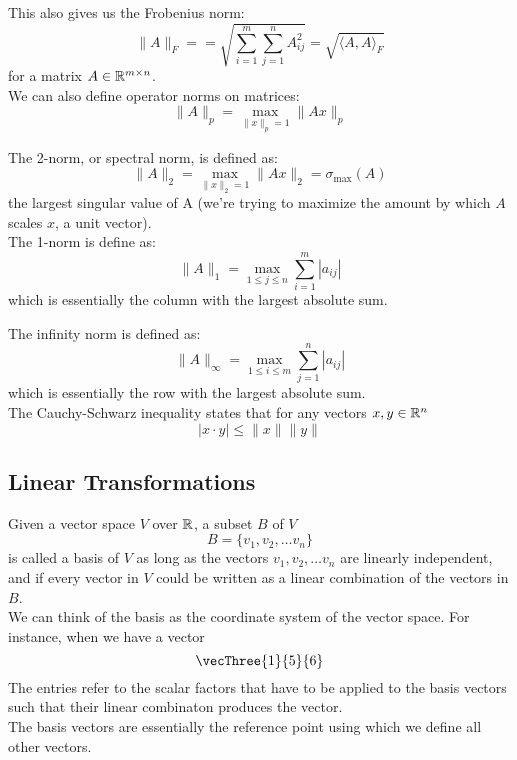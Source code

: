 \documentclass[12pt]{article}
\begin{document}
    This also gives us the Frobenius norm:
    \[ \| A \|_F = = 
    \sqrt{\sum_{i=1}^m\sum_{j=1}^n A_{ij}^2}
    = \sqrt{\langle A, A \rangle_F } \]
    for a matrix $A \in \mathbb{R}^{m \times n}$. \\

    We can also define operator norms on matrices:
    \[ \|A\|_p = \max_{\|x\|_p = 1}\|Ax\|_p \]
    
    The 2-norm, or spectral norm,
    is defined as:
    \[ \|A\|_2 = \max_{\|x\|_2 = 1}\|Ax\|_2
    = \sigma_{\max}(A) \]
    the largest singular value of A
    (we're trying to maximize the amount by which
    $A$ scales $x$, a unit vector). \\

    The 1-norm is define as:
    \[ \|A\|_1 = \max_{1 \leq j \leq n} \sum_{i = 1}^m |a_{ij}| \]
    which is essentially the column
    with the largest absolute sum.
     
    The infinity norm is defined as:
    \[ \|A\|_\infty = \max_{1 \leq i \leq m} 
    \sum_{j = 1}^n |a_{ij}| \]
    which is essentially the row
    with the largest absolute sum. \\

    The Cauchy-Schwarz inequality states that 
    for any vectors $x, y \in \mathbb{R}^n$
    \[|x \cdot y| \leq \|x\|\|y\|\]

    \newpage

    \subsection*{Linear Transformations}

    Given a vector space $V$ over $\mathbb{R}$,
    a subset $B$ of $V$
    \[ B = \{v_1, v_2, \dots v_n \} \]
    is called a basis of $V$ as long as the
    vectors $v_1, v_2, \dots v_n$ are linearly independent,
    and if every vector in $V$ could be written
    as a linear combination of the vectors in $B$. \\

    We can think of the basis as the coordinate
    system of the vector space.
    For instance, when we have a vector
    \[ \vecThree{1}{5}{6} \]
    The entries refer to the scalar factors
    that have to be applied to the basis vectors
    such that their linear combinaton produces
    the vector. \\
    The basis vectors are essentially the reference
    point using which we define all other vectors. \\ 
\end{document}
